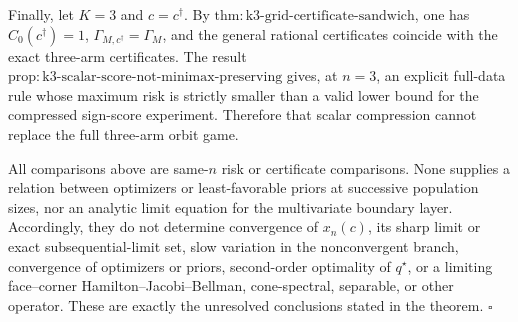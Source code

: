 Finally, let \(K=3\) and \(c=c^\dagger\).  By \(\mathrm{thm:k3\text{-}grid\text{-}certificate\text{-}sandwich}\), one has \(C_0(c^\dagger)=1\), \(\Gamma_{M,c^\dagger}=\Gamma_M\), and the general rational certificates coincide with the exact three-arm certificates.  The result \(\mathrm{prop:k3\text{-}scalar\text{-}score\text{-}not\text{-}minimax\text{-}preserving}\) gives, at \(n=3\), an explicit full-data rule whose maximum risk is strictly smaller than a valid lower bound for the compressed sign-score experiment.  Therefore that scalar compression cannot replace the full three-arm orbit game.

All comparisons above are same-\(n\) risk or certificate comparisons.  None supplies a relation between optimizers or least-favorable priors at successive population sizes, nor an analytic limit equation for the multivariate boundary layer.  Accordingly, they do not determine convergence of \(x_n(c)\), its sharp limit or exact subsequential-limit set, slow variation in the nonconvergent branch, convergence of optimizers or priors, second-order optimality of \(q^\star\), or a limiting face--corner Hamilton--Jacobi--Bellman, cone-spectral, separable, or other operator.  These are exactly the unresolved conclusions stated in the theorem. \(\square\)